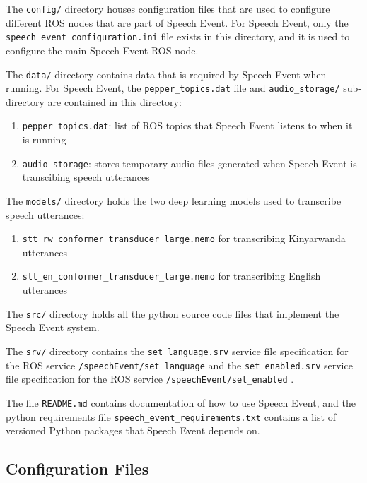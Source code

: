 \documentclass{CSSRforAfrica}
\begin{document}
The \texttt{config/} directory houses configuration files that are used to configure different ROS nodes that are part of Speech Event. For Speech Event, only the \texttt{speech\_event\_configuration.ini} file exists in this directory, and it is used to configure the main Speech Event ROS node.

The \texttt{data/} directory contains data that is required by Speech Event when running. For Speech Event, the \texttt{pepper\_topics.dat} file and \texttt{audio\_storage/} sub-directory are contained in this directory:

\begin{enumerate}
    \item \texttt{pepper\_topics.dat}: list of ROS topics that Speech Event listens to when it is running
    \item \texttt{audio\_storage}: stores temporary audio files generated when Speech Event is transcibing speech utterances
\end{enumerate}

The \texttt{models/} directory holds the two deep learning models used to transcribe speech utterances:

\begin{enumerate}
    \item \texttt{stt\_rw\_conformer\_transducer\_large.nemo} for transcribing Kinyarwanda utterances
    \item \texttt{stt\_en\_conformer\_transducer\_large.nemo} for transcribing English utterances
\end{enumerate}

The \texttt{src/} directory holds all the python source code files that implement the Speech Event system.

The \texttt{srv/} directory contains the \texttt{set\_language.srv} service file specification for the ROS service \texttt{/speechEvent/set\_language} and the \texttt{set\_enabled.srv} service file specification for the ROS service \texttt{/speechEvent/set\_enabled} .

The file \texttt{README.md} contains documentation of how to use Speech Event,  and the python requirements file \texttt{speech\_event\_requirements.txt} contains a list of versioned Python packages that Speech Event depends on.

\subsection{Configuration Files}
\end{document}
